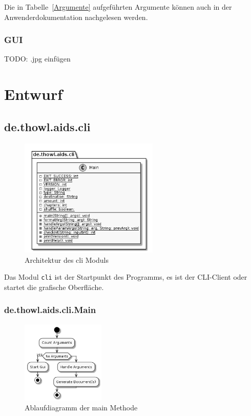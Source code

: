 \documentclass[stu, a4paper, 11pt, floatsintext]{apa7}
\begin{document}
\noindent Die in Tabelle~\ref{Argumente} aufgeführten Argumente können auch in der Anwenderdokumentation nachgelesen werden.

\subsubsection{GUI}

TODO: .jpg einfügen

\clearpage

\section{Entwurf}

\subsection{de.thowl.aids.cli}

\begin{figure}[!htbp]
\centering
\includegraphics[width=250px]{../technical_documentation/diagramm/uml/flowcharts/cli/cli.png}
\caption{\label{CLI Architektur}Architektur des cli Moduls}
\end{figure}

\noindent Das Modul \texttt{cli} ist der Startpunkt des Programms, es ist der CLI-Client oder startet die grafische Oberfläche.

\subsubsection{de.thowl.aids.cli.Main}

\begin{figure}[!htbp]
\centering
\includegraphics[width=150px]{../technical_documentation/diagramm/uml/flowcharts/cli/Main.png}
\caption{\label{main-methode}Ablaufdiagramm der main Methode}
\end{figure}
\end{document}
